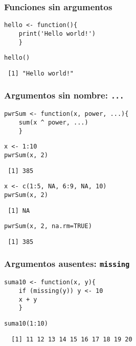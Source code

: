 \documentclass[xcolor={usenames,svgnames,dvipsnames}]{beamer}
\begin{document}
\begin{frame}[fragile]
\frametitle{Funciones sin argumentos}
\label{sec-1-7}


\lstset{language=R}
\begin{lstlisting}
hello <- function(){
    print('Hello world!')
    }
\end{lstlisting}



\lstset{language=R}
\begin{lstlisting}
hello()
\end{lstlisting}

\begin{verbatim}
 [1] "Hello world!"
\end{verbatim}
\end{frame}
\begin{frame}[fragile]
\frametitle{Argumentos sin nombre: \texttt{...}}
\label{sec-1-8}


\lstset{language=R}
\begin{lstlisting}
pwrSum <- function(x, power, ...){
    sum(x ^ power, ...)
    }
\end{lstlisting}



\lstset{language=R}
\begin{lstlisting}
x <- 1:10
pwrSum(x, 2)
\end{lstlisting}

\begin{verbatim}
 [1] 385
\end{verbatim}


\lstset{language=R}
\begin{lstlisting}
x <- c(1:5, NA, 6:9, NA, 10)
pwrSum(x, 2)
\end{lstlisting}

\begin{verbatim}
 [1] NA
\end{verbatim}


\lstset{language=R}
\begin{lstlisting}
pwrSum(x, 2, na.rm=TRUE)
\end{lstlisting}

\begin{verbatim}
 [1] 385
\end{verbatim}
\end{frame}
\begin{frame}[fragile]
\frametitle{Argumentos ausentes: \texttt{missing}}
\label{sec-1-9}


\lstset{language=R}
\begin{lstlisting}
suma10 <- function(x, y){
    if (missing(y)) y <- 10
    x + y
    }
\end{lstlisting}



\lstset{language=R}
\begin{lstlisting}
suma10(1:10)
\end{lstlisting}

\begin{verbatim}
  [1] 11 12 13 14 15 16 17 18 19 20
\end{verbatim}
\end{frame}
\end{document}
